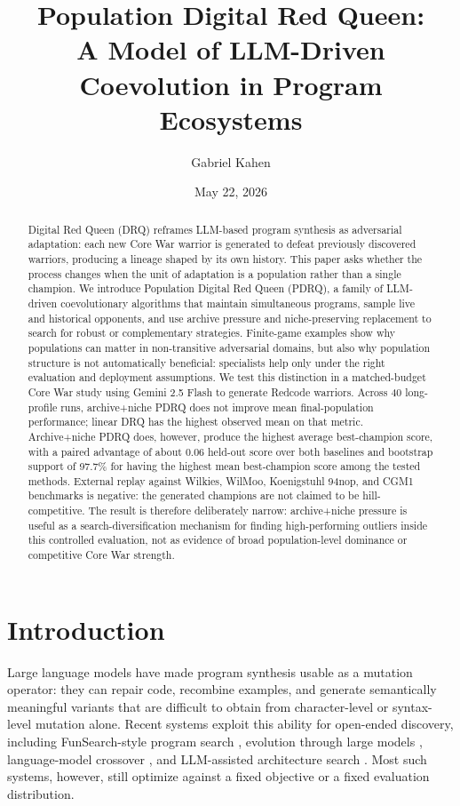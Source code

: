\documentclass[11pt]{article}
\title{Population Digital Red Queen:\\A Model of LLM-Driven Coevolution in Program Ecosystems}
\author{Gabriel Kahen}
\date{May 22, 2026}
\begin{document}
\maketitle

\begin{abstract}
Digital Red Queen (DRQ) reframes LLM-based program synthesis as adversarial adaptation: each new Core War warrior is generated to defeat previously discovered warriors, producing a lineage shaped by its own history. This paper asks whether the process changes when the unit of adaptation is a population rather than a single champion. We introduce Population Digital Red Queen (PDRQ), a family of LLM-driven coevolutionary algorithms that maintain simultaneous programs, sample live and historical opponents, and use archive pressure and niche-preserving replacement to search for robust or complementary strategies. Finite-game examples show why populations can matter in non-transitive adversarial domains, but also why population structure is not automatically beneficial: specialists help only under the right evaluation and deployment assumptions. We test this distinction in a matched-budget Core War study using Gemini 2.5 Flash to generate Redcode warriors. Across 40 long-profile runs, archive+niche PDRQ does not improve mean final-population performance; linear DRQ has the highest observed mean on that metric. Archive+niche PDRQ does, however, produce the highest average best-champion score, with a paired advantage of about 0.06 held-out score over both baselines and bootstrap support of 97.7\% for having the highest mean best-champion score among the tested methods. External replay against Wilkies, WilMoo, Koenigstuhl 94nop, and CGM1 benchmarks is negative: the generated champions are not claimed to be hill-competitive. The result is therefore deliberately narrow: archive+niche pressure is useful as a search-diversification mechanism for finding high-performing outliers inside this controlled evaluation, not as evidence of broad population-level dominance or competitive Core War strength.
\end{abstract}

\section{Introduction}

Large language models have made program synthesis usable as a mutation operator: they can repair code, recombine examples, and generate semantically meaningful variants that are difficult to obtain from character-level or syntax-level mutation alone. Recent systems exploit this ability for open-ended discovery, including FunSearch-style program search \citep{romeraparedes2024funsearch}, evolution through large models \citep{lehman2022elm}, language-model crossover \citep{meyerson2024lmx}, and LLM-assisted architecture search \citep{liu2023evoprompting}. Most such systems, however, still optimize against a fixed objective or a fixed evaluation distribution.
\end{document}
